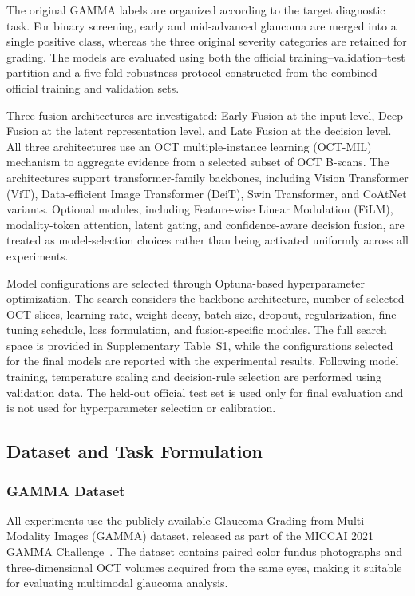 \documentclass[preprint,12pt]{elsarticle}
\begin{document}
The original GAMMA labels are organized according to the target diagnostic task. For binary screening, early and mid-advanced glaucoma are merged into a single positive class, whereas the three original severity categories are retained for grading. The models are evaluated using both the official training--validation--test partition and a five-fold robustness protocol constructed from the combined official training and validation sets.

Three fusion architectures are investigated: Early Fusion at the input level, Deep Fusion at the latent representation level, and Late Fusion at the decision level. All three architectures use an OCT multiple-instance learning (OCT-MIL) mechanism to aggregate evidence from a selected subset of OCT B-scans. The architectures support transformer-family backbones, including Vision Transformer (ViT), Data-efficient Image Transformer (DeiT), Swin Transformer, and CoAtNet variants. Optional modules, including Feature-wise Linear Modulation (FiLM), modality-token attention, latent gating, and confidence-aware decision fusion, are treated as model-selection choices rather than being activated uniformly across all experiments.

Model configurations are selected through Optuna-based hyperparameter optimization. The search considers the backbone architecture, number of selected OCT slices, learning rate, weight decay, batch size, dropout, regularization, fine-tuning schedule, loss formulation, and fusion-specific modules. The full search space is provided in Supplementary Table~S1, while the configurations selected for the final models are reported with the experimental results. Following model training, temperature scaling and decision-rule selection are performed using validation data. The held-out official test set is used only for final evaluation and is not used for hyperparameter selection or calibration.

\subsection{Dataset and Task Formulation}
\label{subsec:dataset_tasks}

\subsubsection{GAMMA Dataset}
\label{subsubsec:gamma_dataset}

All experiments use the publicly available Glaucoma Grading from Multi-Modality Images (GAMMA) dataset, released as part of the MICCAI 2021 GAMMA Challenge~\cite{wu2023gamma}. The dataset contains paired color fundus photographs and three-dimensional OCT volumes acquired from the same eyes, making it suitable for evaluating multimodal glaucoma analysis.
\end{document}
